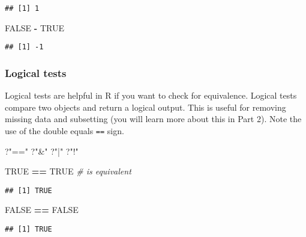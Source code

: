 \documentclass[]{article}
\newenvironment{Shaded}{\begin{snugshade}}{\end{snugshade}}
\newcommand{\StringTok}[1]{\textcolor[rgb]{0.31,0.60,0.02}{#1}}
\newcommand{\CommentTok}[1]{\textcolor[rgb]{0.56,0.35,0.01}{\textit{#1}}}
\newcommand{\OtherTok}[1]{\textcolor[rgb]{0.56,0.35,0.01}{#1}}
\newcommand{\OperatorTok}[1]{\textcolor[rgb]{0.81,0.36,0.00}{\textbf{#1}}}
\newcommand{\NormalTok}[1]{#1}
\begin{document}
\begin{verbatim}
## [1] 1
\end{verbatim}

\begin{Shaded}
\begin{Highlighting}[]
\OtherTok{FALSE} \OperatorTok{-}\StringTok{ }\OtherTok{TRUE}
\end{Highlighting}
\end{Shaded}

\begin{verbatim}
## [1] -1
\end{verbatim}

\subsubsection{Logical tests}\label{logical-tests}

Logical tests are helpful in R if you want to check for equivalence.
Logical tests compare two objects and return a logical output. This is
useful for removing missing data and subsetting (you will learn more
about this in Part 2). Note the use of the double equals \texttt{==}
sign.

\begin{Shaded}
\begin{Highlighting}[]
\NormalTok{?}\StringTok{"=="}
\NormalTok{?}\StringTok{"&"}
\NormalTok{?}\StringTok{"|"}
\NormalTok{?}\StringTok{"!"}
\end{Highlighting}
\end{Shaded}

\begin{Shaded}
\begin{Highlighting}[]
\OtherTok{TRUE} \OperatorTok{==}\StringTok{ }\OtherTok{TRUE} \CommentTok{# is equivalent}
\end{Highlighting}
\end{Shaded}

\begin{verbatim}
## [1] TRUE
\end{verbatim}

\begin{Shaded}
\begin{Highlighting}[]
\OtherTok{FALSE} \OperatorTok{==}\StringTok{ }\OtherTok{FALSE}
\end{Highlighting}
\end{Shaded}

\begin{verbatim}
## [1] TRUE
\end{verbatim}
\end{document}
